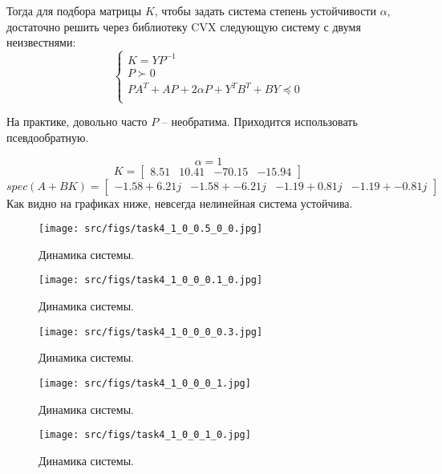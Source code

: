 Тогда для подбора матрицы \(K\), чтобы задать система степень устойчивости \(\alpha\), достаточно решить через библиотеку CVX следующую систему с двумя неизвестнями:
\[
        \begin{cases}
                K = YP^{-1}\\
                P \succ 0 \\
                PA^T + AP + 2 \alpha P + Y^T B^T + BY \preccurlyeq 0  \\
        \end{cases} 
\]

На практике, довольно часто \(P\) -- необратима. Приходится использовать псевдообратную.

\[\alpha = 1\]
\[K = \begin{bmatrix}
  8.51 &  10.41 & -70.15 & -15.94
\end{bmatrix}\]
\[spec(A + B K) = \begin{bmatrix}
 -1.58 + 6.21j & -1.58 + -6.21j & -1.19 + 0.81j & -1.19 + -0.81j
\end{bmatrix}\]
Как видно на графиках ниже, невсегда нелинейная система устойчива. 
\begin{figure}[ht!]
    \centering
    \texttt{[image: src/figs/task4\_1\_0\_0.5\_0\_0.jpg]}
    \caption{Динамика системы.}
    \label{fig:task4_1_1}
\end{figure}

\begin{figure}[ht!]
    \centering
    \texttt{[image: src/figs/task4\_1\_0\_0\_0.1\_0.jpg]}
    \caption{Динамика системы.}
    \label{fig:task4_1_2}
\end{figure}

\begin{figure}[ht!]
    \centering
    \texttt{[image: src/figs/task4\_1\_0\_0\_0\_0.3.jpg]}
    \caption{Динамика системы.}
    \label{fig:task4_1_3}
\end{figure}

\begin{figure}[ht!]
    \centering
    \texttt{[image: src/figs/task4\_1\_0\_0\_0\_1.jpg]}
    \caption{Динамика системы.}
    \label{fig:task4_1_4}
\end{figure}

\begin{figure}[ht!]
    \centering
    \texttt{[image: src/figs/task4\_1\_0\_0\_1\_0.jpg]}
    \caption{Динамика системы.}
    \label{fig:task4_1_5}
\end{figure}

